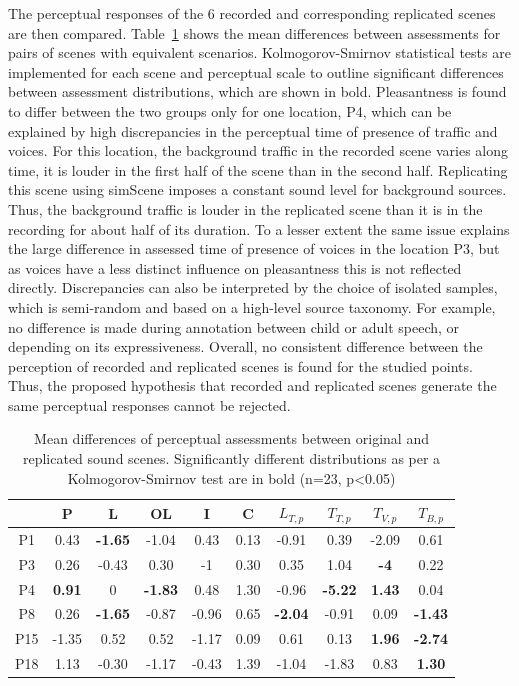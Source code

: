 \documentclass[11pt,a4paper]{article}
\begin{document}
The perceptual responses of the 6 recorded and corresponding replicated scenes are then compared. Table~\ref{tab:ogrep} shows the mean differences between assessments for pairs of scenes with equivalent scenarios. Kolmogorov-Smirnov statistical tests are implemented for each scene and perceptual scale to outline significant differences between assessment distributions, which are shown in bold. Pleasantness is found to differ between the two groups only for one location, P4, which can be explained by high discrepancies in the perceptual time of presence of traffic and voices. For this location, the background traffic in the recorded scene varies along time, it is louder in the first half of the scene than in the second half. Replicating this scene using simScene imposes a constant sound level for background sources. Thus, the background traffic is louder in the replicated scene than it is in the recording for about half of its duration. To a lesser extent the same issue explains the large difference in assessed time of presence of voices in the location P3, but as voices have a less distinct influence on pleasantness this is not reflected directly. Discrepancies can also be interpreted by the choice of isolated samples, which is semi-random and based on a high-level source taxonomy. For example, no difference is made during annotation between child or adult speech, or depending on its expressiveness. Overall, no consistent difference between the perception of recorded and replicated scenes is found for the studied points. Thus, the proposed hypothesis that recorded and replicated scenes generate the same perceptual responses cannot be rejected.\\

\begin{table}[h]
\centering
\caption{Mean differences of perceptual assessments between original and replicated sound scenes. Significantly different distributions as per a Kolmogorov-Smirnov test are in bold (n=23, p<0.05)}
\label{tab:ogrep}
\begin{tabular}{ c | c c c c c c c c c }
\hline
	 & P & L & OL & I & C & $L_{T, p}$ & $T_{T, p}$ & $T_{V, p}$ & $T_{B, p}$ \\ \hline
	P1 & 0.43 & \textbf{-1.65} & -1.04 & 0.43 & 0.13 & -0.91 & 0.39 & -2.09 & 0.61 \\
	P3 & 0.26 & -0.43 & 0.30 & -1 & 0.30 & 0.35 & 1.04 & \textbf{-4} & 0.22 \\
	P4 & \textbf{0.91} & 0 & \textbf{-1.83} & 0.48 & 1.30 & -0.96 & \textbf{-5.22} & \textbf{1.43} & 0.04 \\
	P8 & 0.26 & \textbf{-1.65} & -0.87 & -0.96 & 0.65 & \textbf{-2.04} & -0.91 & 0.09 & \textbf{-1.43} \\
	P15 & -1.35 & 0.52 & 0.52 & -1.17 & 0.09 & 0.61 & 0.13 & \textbf{1.96} & \textbf{-2.74} \\
	P18 & 1.13 & -0.30 & -1.17 & -0.43 & 1.39 & -1.04 & -1.83 & 0.83 & \textbf{1.30} \\ \hline
\end{tabular}
\end{table}
\end{document}
